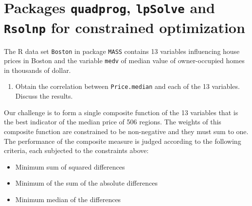 \documentclass[
]{book}
\newenvironment{Shaded}{\begin{snugshade}}{\end{snugshade}}
\newcommand{\FunctionTok}[1]{\textcolor[rgb]{0.13,0.29,0.53}{\textbf{#1}}}
\newcommand{\NormalTok}[1]{#1}
\newcommand{\OtherTok}[1]{\textcolor[rgb]{0.56,0.35,0.01}{#1}}
\newcommand{\SpecialCharTok}[1]{\textcolor[rgb]{0.81,0.36,0.00}{\textbf{#1}}}
\providecommand{\tightlist}{%
  \setlength{\itemsep}{0pt}\setlength{\parskip}{0pt}}
\begin{document}
\section{\texorpdfstring{Packages \texttt{quadprog}, \texttt{lpSolve} and \texttt{Rsolnp} for constrained optimization}{Packages quadprog, lpSolve and Rsolnp for constrained optimization}}\label{packages-quadprog-lpsolve-and-rsolnp-for-constrained-optimization}

The R data set \texttt{Boston} in package \texttt{MASS} contains 13 variables influencing house prices in Boston and the variable \texttt{medv} of median value of owner-occupied homes in thousands of dollar.

\begin{Shaded}
\end{Shaded}

\begin{enumerate}
\def\labelenumi{(\alph{enumi})}
\tightlist
\item
  Obtain the correlation between \texttt{Price.median} and each of the 13 variables. Discuss the results.
\end{enumerate}

Our challenge is to form a single composite function of the 13 variables that is the best indicator of the median price of 506 regions. The weights of this composite function are constrained to be non-negative and they must sum to one. The performance of the composite measure is judged according to the following criteria, each subjected to the constraints above:

\begin{itemize}
\tightlist
\item
  Minimum sum of squared differences
\item
  Minimum of the sum of the absolute differences
\item
  Minimum median of the differences
\end{itemize}
\end{document}
